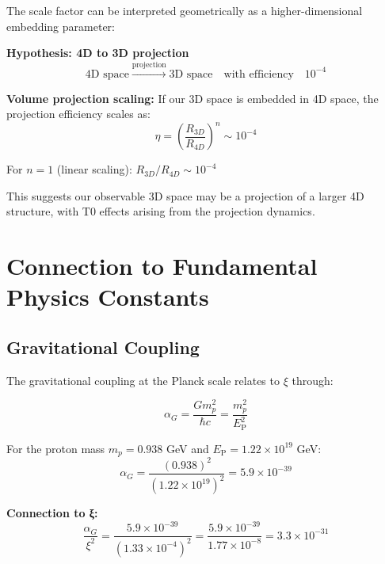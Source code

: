 \documentclass[12pt,a4paper]{report}
\newcommand{\EP}{E_{\text{P}}}            %
\begin{document}
	The scale factor can be interpreted geometrically as a higher-dimensional embedding parameter:
	
	\textbf{Hypothesis: 4D to 3D projection}
	\begin{equation}
		\text{4D space} \xrightarrow{\text{projection}} \text{3D space} \quad \text{with efficiency} \quad 10^{-4}
	\end{equation}
	
	\textbf{Volume projection scaling:}
	If our 3D space is embedded in 4D space, the projection efficiency scales as:
	\begin{equation}
		\eta = \left(\frac{R_{3D}}{R_{4D}}\right)^n \sim 10^{-4}
	\end{equation}
	
	For $n = 1$ (linear scaling): $R_{3D}/R_{4D} \sim 10^{-4}$
	
	This suggests our observable 3D space may be a projection of a larger 4D structure, with T0 effects arising from the projection dynamics.
	
	\section{Connection to Fundamental Physics Constants}
	\label{sec:fundamental_constants}
	

	\subsection{Gravitational Coupling}
	\label{subsec:gravitational_coupling}
	
	The gravitational coupling at the Planck scale relates to $\xi$ through:
	
	\begin{equation}
		\alpha_G = \frac{Gm_p^2}{\hbar c} = \frac{m_p^2}{\EP^2}
	\end{equation}
	
	For the proton mass $m_p = 0.938$ GeV and $\EP = 1.22 \times 10^{19}$ GeV:
	\begin{equation}
		\alpha_G = \frac{(0.938)^2}{(1.22 \times 10^{19})^2} = 5.9 \times 10^{-39}
	\end{equation}
	
	\textbf{Connection to ξ:}
	\begin{equation}
		\frac{\alpha_G}{\xi^2} = \frac{5.9 \times 10^{-39}}{(1.33 \times 10^{-4})^2} = \frac{5.9 \times 10^{-39}}{1.77 \times 10^{-8}} = 3.3 \times 10^{-31}
	\end{equation}
	
\end{document}
